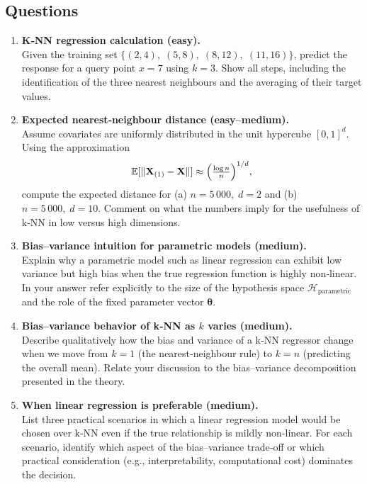 \documentclass[12pt, a4paper]{article}
\begin{document}
\subsection{Questions}
\begin{enumerate}
\item \textbf{K‑NN regression calculation (easy).}\\
Given the training set \(\{(2,4),\;(5,8),\;(8,12),\;(11,16)\}\), predict the response for a query point \(x=7\) using \(k=3\). Show all steps, including the identification of the three nearest neighbours and the averaging of their target values.

\item \textbf{Expected nearest‑neighbour distance (easy–medium).}\\
Assume covariates are uniformly distributed in the unit hypercube \([0,1]^{d}\).  Using the approximation 
\[
\mathbb{E}[\|\mathbf{X}_{(1)}-\mathbf{X}\|] \approx \Bigl(\tfrac{\log n}{n}\Bigr)^{1/d},
\]
compute the expected distance for (a) \(n=5\,000,\; d=2\) and (b) \(n=5\,000,\; d=10\).  Comment on what the numbers imply for the usefulness of k‑NN in low versus high dimensions.

\item \textbf{Bias–variance intuition for parametric models (medium).}\\
Explain why a parametric model such as linear regression can exhibit low variance but high bias when the true regression function is highly non‑linear.  In your answer refer explicitly to the size of the hypothesis space \(\mathcal H_{\text{parametric}}\) and the role of the fixed parameter vector \(\boldsymbol\theta\).

\item \textbf{Bias–variance behavior of k‑NN as \(k\) varies (medium).}\\
Describe qualitatively how the bias and variance of a k‑NN regressor change when we move from \(k=1\) (the nearest‑neighbour rule) to \(k=n\) (predicting the overall mean).  Relate your discussion to the bias–variance decomposition presented in the theory.

\item \textbf{When linear regression is preferable (medium).}\\
List three practical scenarios in which a linear regression model would be chosen over k‑NN even if the true relationship is mildly non‑linear.  For each scenario, identify which aspect of the bias–variance trade‑off or which practical consideration (e.g., interpretability, computational cost) dominates the decision.


\end{enumerate}
\end{document}
